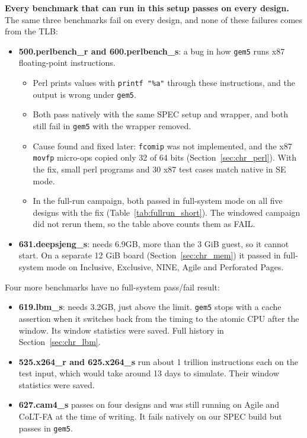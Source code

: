 \noindent \textbf{Every benchmark that can run in this setup passes on every design.} The same three benchmarks fail on every design, and none of these failures comes from the TLB:
\begin{itemize}
    \item \textbf{500.perlbench\_r and 600.perlbench\_s}: a bug in how \texttt{gem5} runs x87 floating-point instructions.
    \begin{itemize}
        \item Perl prints values with \texttt{printf "\%a"} through these instructions, and the output is wrong under \texttt{gem5}.
        \item Both pass natively with the same SPEC setup and wrapper, and both still fail in \texttt{gem5} with the wrapper removed.
        \item Cause found and fixed later: \texttt{fcomip} was not implemented, and the x87 \texttt{movfp} micro-ops copied only 32 of 64 bits (Section~\ref{sec:chr_perl}). With the fix, small perl programs and 30 x87 test cases match native in SE mode.
        \item In the full-run campaign, both passed in full-system mode on all five designs with the fix (Table~\ref{tab:fullrun_short}). The windowed campaign did not rerun them, so the table above counts them as FAIL.
    \end{itemize}
    \item \textbf{631.deepsjeng\_s}: needs 6.9GB, more than the 3 GiB guest, so it cannot start. On a separate 12 GiB board (Section~\ref{sec:chr_mem}) it passed in full-system mode on Inclusive, Exclusive, NINE, Agile and Perforated Pages.
\end{itemize}

\noindent Four more benchmarks have no full-system pass/fail result:
\begin{itemize}
    \item \textbf{619.lbm\_s}: needs 3.2GB, just above the limit. \texttt{gem5} stops with a cache assertion when it switches back from the timing to the atomic CPU after the window. Its window statistics were saved. Full history in Section~\ref{sec:chr_lbm}.
    \item \textbf{525.x264\_r and 625.x264\_s} run about 1 trillion instructions each on the test input, which would take around 13 days to simulate. Their window statistics were saved.
    \item \textbf{627.cam4\_s} passes on four designs and was still running on Agile and CoLT-FA at the time of writing. It fails natively on our SPEC build but passes in \texttt{gem5}.
\end{itemize}

